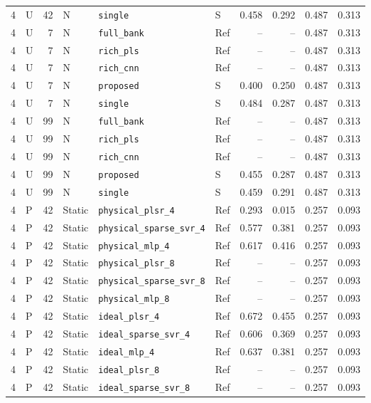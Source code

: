 \documentclass[10pt,a4paper]{article}
\begin{document}
\begin{landscape}
\begin{longtable}{rlrlllrrrr}
4 & U & 42 & N & \texttt{single} & S & 0.458 & 0.292 & 0.487 & 0.313 \\
4 & U & 7 & N & \texttt{full\_bank} & Ref & -- & -- & 0.487 & 0.313 \\
4 & U & 7 & N & \texttt{rich\_pls} & Ref & -- & -- & 0.487 & 0.313 \\
4 & U & 7 & N & \texttt{rich\_cnn} & Ref & -- & -- & 0.487 & 0.313 \\
4 & U & 7 & N & \texttt{proposed} & S & 0.400 & 0.250 & 0.487 & 0.313 \\
4 & U & 7 & N & \texttt{single} & S & 0.484 & 0.287 & 0.487 & 0.313 \\
4 & U & 99 & N & \texttt{full\_bank} & Ref & -- & -- & 0.487 & 0.313 \\
4 & U & 99 & N & \texttt{rich\_pls} & Ref & -- & -- & 0.487 & 0.313 \\
4 & U & 99 & N & \texttt{rich\_cnn} & Ref & -- & -- & 0.487 & 0.313 \\
4 & U & 99 & N & \texttt{proposed} & S & 0.455 & 0.287 & 0.487 & 0.313 \\
4 & U & 99 & N & \texttt{single} & S & 0.459 & 0.291 & 0.487 & 0.313 \\
4 & P & 42 & Static & \texttt{physical\_plsr\_4} & Ref & 0.293 & 0.015 & 0.257 & 0.093 \\
4 & P & 42 & Static & \texttt{physical\_sparse\_svr\_4} & Ref & 0.577 & 0.381 & 0.257 & 0.093 \\
4 & P & 42 & Static & \texttt{physical\_mlp\_4} & Ref & 0.617 & 0.416 & 0.257 & 0.093 \\
4 & P & 42 & Static & \texttt{physical\_plsr\_8} & Ref & -- & -- & 0.257 & 0.093 \\
4 & P & 42 & Static & \texttt{physical\_sparse\_svr\_8} & Ref & -- & -- & 0.257 & 0.093 \\
4 & P & 42 & Static & \texttt{physical\_mlp\_8} & Ref & -- & -- & 0.257 & 0.093 \\
4 & P & 42 & Static & \texttt{ideal\_plsr\_4} & Ref & 0.672 & 0.455 & 0.257 & 0.093 \\
4 & P & 42 & Static & \texttt{ideal\_sparse\_svr\_4} & Ref & 0.606 & 0.369 & 0.257 & 0.093 \\
4 & P & 42 & Static & \texttt{ideal\_mlp\_4} & Ref & 0.637 & 0.381 & 0.257 & 0.093 \\
4 & P & 42 & Static & \texttt{ideal\_plsr\_8} & Ref & -- & -- & 0.257 & 0.093 \\
4 & P & 42 & Static & \texttt{ideal\_sparse\_svr\_8} & Ref & -- & -- & 0.257 & 0.093 \\

\end{longtable}
\end{landscape}
\end{document}
